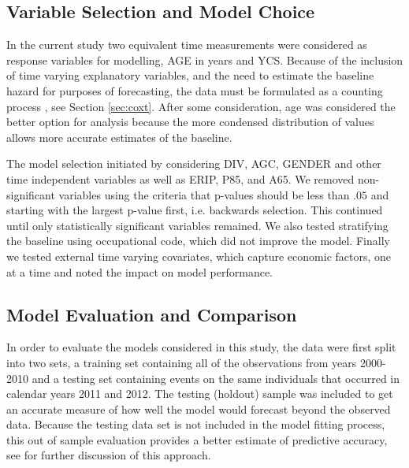 \documentclass[12pt,letterpaper]{article}
\begin{document}
\subsection{Variable Selection and Model Choice} \label{sec:modelchoice}
In the current study two equivalent time measurements were considered as response variables for modelling, AGE in years and YCS.  Because of the inclusion of time varying explanatory variables, and the need to estimate the baseline hazard for purposes of forecasting, the data must be formulated as a counting process , see Section \ref{sec:coxt}.  After some consideration, age was considered the better option for analysis because the more condensed distribution of values allows more accurate estimates of the baseline.

The model selection initiated by considering DIV, AGC, GENDER and other time independent variables as well as ERIP, P85, and A65. We removed non-significant variables using the criteria that p-values should be less than $.05$ and starting with the largest p-value first, i.e. backwards selection.  This continued until only statistically significant variables remained.  We also tested stratifying the baseline using occupational code, which did not improve the model. Finally we tested external time varying covariates, which capture economic factors, one at a time and noted the impact on model performance.


\subsection{Model Evaluation and Comparison}

In order to evaluate the models considered in this study, the data were first split into two sets, a training set containing all of the observations from years 2000-2010 and a testing set containing events on the same individuals that occurred in calendar years 2011 and 2012. The testing (holdout) sample was included to get an accurate measure of how well the model would forecast beyond the observed data.  Because the testing data set is not included in the model fitting process, this out of sample evaluation provides a better estimate of predictive accuracy, see \citet{kuhn2013} for further discussion of this approach.
\end{document}
